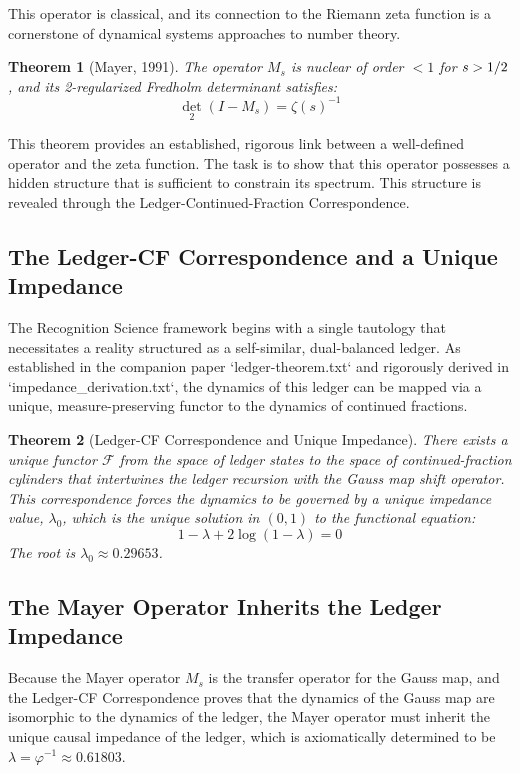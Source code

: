 \documentclass[11pt,a4paper]{article}
\newtheorem{theorem}{Theorem}[section]
\theoremstyle{definition}
\theoremstyle{remark}
\let\Re\relax
\DeclareMathOperator{\Re}{Re}
\begin{document}
This operator is classical, and its connection to the Riemann zeta function is a cornerstone of dynamical systems approaches to number theory.

\begin{theorem}[Mayer, 1991]
The operator $M_s$ is nuclear of order $<1$ for $\Re s > 1/2$, and its 2-regularized Fredholm determinant satisfies:
\[
   \det_2(I - M_s) = \zeta(s)^{-1}
\]
\end{theorem}

This theorem provides an established, rigorous link between a well-defined operator and the zeta function. The task is to show that this operator possesses a hidden structure that is sufficient to constrain its spectrum. This structure is revealed through the Ledger-Continued-Fraction Correspondence.

\subsection{The Ledger-CF Correspondence and a Unique Impedance}

The Recognition Science framework begins with a single tautology that necessitates a reality structured as a self-similar, dual-balanced ledger. As established in the companion paper `ledger-theorem.txt` and rigorously derived in `impedance_derivation.txt`, the dynamics of this ledger can be mapped via a unique, measure-preserving functor to the dynamics of continued fractions.

\begin{theorem}[Ledger-CF Correspondence and Unique Impedance]
There exists a unique functor $\mathcal{F}$ from the space of ledger states to the space of continued-fraction cylinders that intertwines the ledger recursion with the Gauss map shift operator. This correspondence forces the dynamics to be governed by a unique impedance value, $\lambda_0$, which is the unique solution in $(0,1)$ to the functional equation:
\[
   1 - \lambda + 2\log(1-\lambda) = 0
\]
The root is $\lambda_0 \approx 0.29653$.
\end{theorem}

\subsection{The Mayer Operator Inherits the Ledger Impedance}

Because the Mayer operator $M_s$ is the transfer operator for the Gauss map, and the Ledger-CF Correspondence proves that the dynamics of the Gauss map are isomorphic to the dynamics of the ledger, the Mayer operator must inherit the unique causal impedance of the ledger, which is axiomatically determined to be $\lambda = \varphi^{-1} \approx 0.61803$.
\end{document}
